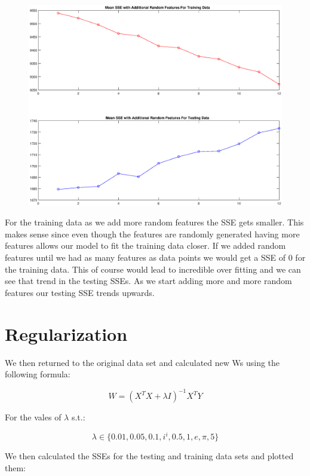 \documentclass{article}
\begin{document}
	\begin{figure}[h!]
		\begin{center} 
			\includegraphics[scale=0.45]{random_figure.eps} 
		\end{center} 
		\label{fig:M1}
	\end{figure}
	
For the training data as we add more random features the SSE gets smaller. This makes sense since even though the features are randomly generated having more features allows our model to fit the training data closer. If we added random features until we had as many features as data points we would get a SSE of 0 for the training data. This of course would lead to incredible over fitting and we can see that trend in the testing SSEs. As we start adding more and more random features our testing SSE trends upwards.
	
	\newpage
	
	\section{Regularization}
	
We then returned to the original data set and calculated new Ws using the following formula:
	
	$$
	W = (X^{T}X + \lambda I)^{-1}X^{T}Y
	$$
	
For the vales of $\lambda$ s.t.:

$$
\lambda \in \{ 0.01, 0.05, 0.1, i^{i}, 0.5, 1, e, \pi, 5 \}
$$
	
We then calculated the SSEs for the testing and training data sets and plotted them:
	
\end{document}

